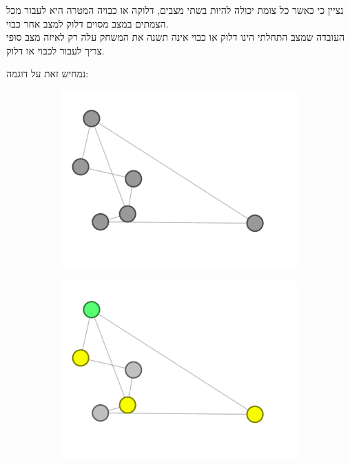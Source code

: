 \documentclass[12pt,twoside]{article}
\begin{document}
נציין כי כאשר כל צומת יכולה להיות בשתי מצבים,
דלוקה או כבויה המטרה היא לעבור מכל הצמתים במצב מסוים דלוק למצב אחר כבוי.
\\
העובדה שמצב התחלתי הינו דלוק או כבוי אינה תשנה את המשחק עלה רק לאיזה מצב סופי צריך לעבור
לכבוי או דלוק.

נמחיש זאת על דוגמה:
\begin{figure}[ht]
    \begin{subfigure}{.5\textwidth}
        \unsethebrew
        \caption{}
        \centering
        \includegraphics[width=\textwidth,height=\textheight,keepaspectratio]{images/graph_start_board.png}
        \sethebrew
    \end{subfigure}%
    \begin{subfigure}{.5\textwidth}
        \unsethebrew
        \caption{}
        \centering
        \includegraphics[width=\textwidth,height=\textheight,keepaspectratio]{images/graph_press.png}
        \sethebrew
    \end{subfigure}%
\end{figure}
\end{document}
